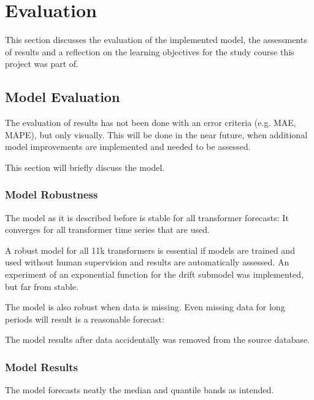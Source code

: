 \documentclass[letterpaper,10pt,english]{sphinxmanual}
\let\sphinxpxdimen\pdfpxdimen\else\newdimen\sphinxpxdimen
\begin{document}
\chapter{Evaluation}
\label{\detokenize{evaluation:evaluation}}\label{\detokenize{evaluation::doc}}
This section discusses the evaluation of the implemented model, the assessments of results and a reflection on the learning objectives for the study course this project was part of.


\section{Model Evaluation}
\label{\detokenize{evaluation:model-evaluation}}
The evaluation of results has not been done with an error criteria (e.g. MAE, MAPE), but only visually.
This will be done in the near future, when additional model improvements are implemented and needed to be assessed.

This section will briefly discuss the model.


\subsection{Model Robustness}
\label{\detokenize{evaluation:model-robustness}}
The model as it is described before is stable for all transformer forecasts: It converges for all transformer time series that are used.

A robust model for all 11k transformers is essential if models are trained and used without human supervision and results are automatically assessed.
An experiment of an exponential function for the drift sub\sphinxhyphen{}model was implemented, but far from stable.

The model is also robust when data is missing. Even missing data for long periods will result is a reasonable forecast:
\begin{quote}

\noindent{\hspace*{\fill}\sphinxincludegraphics[width=800\sphinxpxdimen]{{missing_data_results}.png}\hspace*{\fill}}
\end{quote}

The model results after data accidentally was removed from the source database.


\subsection{Model Results}
\label{\detokenize{evaluation:model-results}}
The model forecasts neatly the median and quantile bands as intended.
\end{document}
